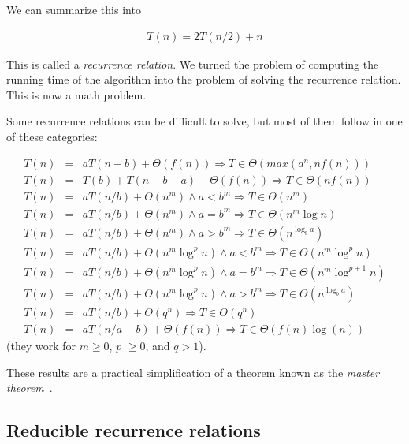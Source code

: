 \documentclass[justified, sixbynine]{tufte-book}
\theoremstyle{plain}%
\newtheorem * {corollary}{Corollary}
\theoremstyle{definition}
\theoremstyle{remark}
\newtheorem * {remark}{Remark}
\newtheorem * {note}{Note}
\begin{document}
\begin{fullwidth}
We can summarize this into

\begin{eqnarray}
T(n) = 2T(n/2) + n
\end{eqnarray}

This is called a {\it recurrence relation}. We turned the problem of computing the running time of the algorithm into the problem of solving the recurrence relation. This is now a math problem.

Some recurrence relations can be difficult to solve, but most of them follow in one of these categories:

\begin{eqnarray}
T(n) \!\!\!\!\!&=&\!\!\!\!\!aT(n-b)+\Theta (f(n))\Rightarrow T\!\in\! \Theta (max(a^n, nf(n))) \\
T(n) \!\!\!\!\!&=&\!\!\!\!\!T(b)+T(n-b-a)+\Theta(f(n))\Rightarrow T\!\in\! \Theta (nf(n)) \\
T(n) \!\!\!\!\!&=&\!\!\!\!\!aT(n/b)+\Theta (n^m)\land a<b^m\Rightarrow T\!\in\! \Theta (n^m) \\
T(n) \!\!\!\!\!&=&\!\!\!\!\!aT(n/b)+\Theta (n^m)\land a=b^m\Rightarrow T\!\in\! \Theta
(n^m\log n) \\
T(n) \!\!\!\!\!&=&\!\!\!\!\!aT(n/b)+\Theta (n^m)\land a>b^m\Rightarrow T\!\in\! \Theta
(n^{\log _ba}) \\
T(n) \!\!\!\!\!&=&\!\!\!\!\!aT(n/b)+\Theta (n^m\log ^pn)\land a<b^m\Rightarrow T\!\in\!
\Theta (n^m\log ^pn) \\
T(n) \!\!\!\!\!&=&\!\!\!\!\!aT(n/b)+\Theta (n^m\log ^pn)\land a=b^m\Rightarrow T\!\in\!
\Theta (n^m\log ^{p+1}n) \\
T(n) \!\!\!\!\!&=&\!\!\!\!\!aT(n/b)+\Theta (n^m\log ^pn)\land a>b^m\Rightarrow T\!\in\!
\Theta (n^{\log _ba}) \\
T(n) \!\!\!\!\!&=&\!\!\!\!\!aT(n/b)+\Theta (q^n)\Rightarrow T\!\in\! \Theta (q^n) \\
T(n) \!\!\!\!\!&=&\!\!\!\!\!aT(n/a-b)+\Theta (f(n)) \Rightarrow T\!\in\! \Theta (f(n)\log(n))
\end{eqnarray}
(they work for $m\geq 0$, $p$ $\geq 0$, and $q>1$).


These results are a practical simplification of a theorem known as the {\it master theorem}~\cite{mastertheorem}.

\goodbreak\subsection{Reducible recurrence relations}


\end{fullwidth}
\end{document}
